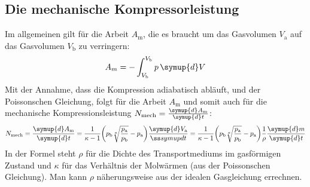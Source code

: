 \subsection{Die mechanische Kompressorleistung}
Im allgemeinen gilt für die Arbeit $A_{\text{m}}$, die es braucht um das Gasvolumen $V_{\text{a}}$ auf das Gasvolumen $V_{\text{b}}$ zu verringern: 
\begin{equation*}
    A_m = - \int_{V_{\text{b}}}^{V_{\text{b}}} p\, \symup{d}V
\end{equation*}
Mit der Annahme, dass die Kompression adiabatisch abläuft, und der Poissonschen Gleichung, folgt für die Arbeit $A_{\text{m}}$ und somit auch für die mechanische Kompressionsleistung $N_{\text{mech}} = \frac{\symup{d}A_{\text{m}}}{\symup{d}t}$:
\begin{equation} \label{eqn:kompressorleistung}
    N_{\text{mech}} = \frac{\symup{d}A_{\text{m}}}{\symup{d}t} 
    = \frac{1}{\kappa - 1} \biggl( p_{\text{b}} \sqrt[\kappa]{\frac{p_{\text{a}}}{p_{\text{b}}}} - p_{\text{a}} \biggr) \frac{\symup{d}V_{\text{a}}}{ßsymup{d}t}
    = \frac{1}{\kappa -1} \biggl( p_{\text{b}} \sqrt[\kappa]{\frac{p_{\text{a}}}{p_{\text{b}}}} - p_{\text{a}} \biggr) \frac{1}{\rho} \frac{\symup{d}m}{\symup{d}t}
\end{equation}
In der Formel steht $\rho$ für die Dichte des Transportmediums im gasförmigen Zustand und $\kappa$ für das Verhältnis der Molwärmen (aus der Poissonschen Gleichung).
Man kann $\rho$ näherungsweise aus der idealen Gasgleichung errechnen.